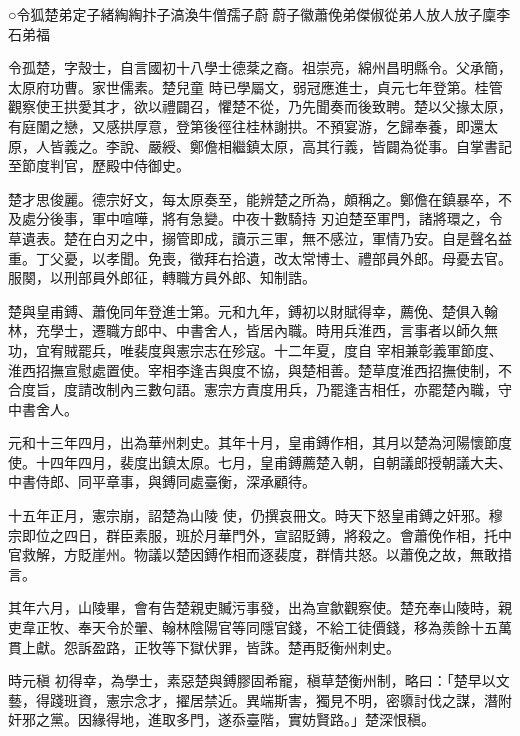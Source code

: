 
\begin{pinyinscope}

 ○令狐楚弟定子緒綯綯抃子滈渙牛僧孺子蔚蔚子徽蕭俛弟傑俶從弟人放人放子廩李石弟福



 令孤楚，字殼士，自言國初十八學士德棻之裔。祖崇亮，綿州昌明縣令。父承簡，太原府功曹。家世儒素。楚兒童
 時已學屬文，弱冠應進士，貞元七年登第。桂管觀察使王拱愛其才，欲以禮闢召，懼楚不從，乃先聞奏而後致聘。楚以父掾太原，有庭闈之戀，又感拱厚意，登第後徑往桂林謝拱。不預宴游，乞歸奉養，即還太原，人皆義之。李說、嚴綬、鄭儋相繼鎮太原，高其行義，皆闢為從事。自掌書記至節度判官，歷殿中侍御史。



 楚才思俊麗。德宗好文，每太原奏至，能辨楚之所為，頗稱之。鄭儋在鎮暴卒，不及處分後事，軍中喧嘩，將有急變。中夜十數騎持
 刃迫楚至軍門，諸將環之，令草遺表。楚在白刃之中，搦管即成，讀示三軍，無不感泣，軍情乃安。自是聲名益重。丁父憂，以孝聞。免喪，徵拜右拾遺，改太常博士、禮部員外郎。母憂去官。服闋，以刑部員外郎征，轉職方員外郎、知制誥。



 楚與皇甫鎛、蕭俛同年登進士第。元和九年，鎛初以財賦得幸，薦俛、楚俱入翰林，充學士，遷職方郎中、中書舍人，皆居內職。時用兵淮西，言事者以師久無功，宜宥賊罷兵，唯裴度與憲宗志在殄寇。十二年夏，度自
 宰相兼彰義軍節度、淮西招撫宣慰處置使。宰相李逢吉與度不協，與楚相善。楚草度淮西招撫使制，不合度旨，度請改制內三數句語。憲宗方責度用兵，乃罷逢吉相任，亦罷楚內職，守中書舍人。



 元和十三年四月，出為華州刺史。其年十月，皇甫鎛作相，其月以楚為河陽懷節度使。十四年四月，裴度出鎮太原。七月，皇甫鎛薦楚入朝，自朝議郎授朝議大夫、中書侍郎、同平章事，與鎛同處臺衡，深承顧待。



 十五年正月，憲宗崩，詔楚為山陵
 使，仍撰哀冊文。時天下怒皇甫鎛之奸邪。穆宗即位之四日，群臣素服，班於月華門外，宣詔貶鎛，將殺之。會蕭俛作相，托中官救解，方貶崖州。物議以楚因鎛作相而逐裴度，群情共怒。以蕭俛之故，無敢措言。



 其年六月，山陵畢，會有告楚親吏贓污事發，出為宣歙觀察使。楚充奉山陵時，親吏韋正牧、奉天令於翬、翰林陰陽官等同隱官錢，不給工徒價錢，移為羨餘十五萬貫上獻。怨訴盈路，正牧等下獄伏罪，皆誅。楚再貶衡州刺史。



 時元稹
 初得幸，為學士，素惡楚與鎛膠固希寵，稹草楚衡州制，略曰：「楚早以文藝，得踐班資，憲宗念才，擢居禁近。異端斯害，獨見不明，密隳討伐之謀，潛附奸邪之黨。因緣得地，進取多門，遂忝臺階，實妨賢路。」楚深恨稹。




\end{pinyinscope}
